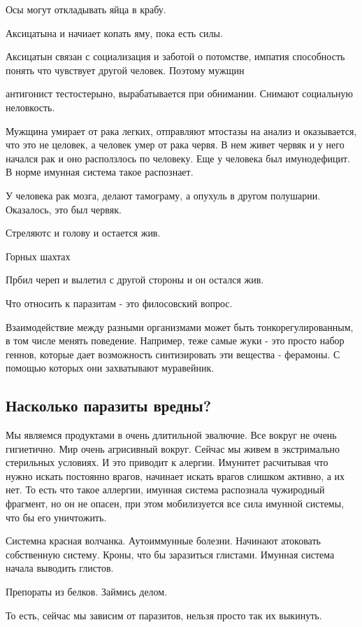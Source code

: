 Осы могут откладывать яйца в крабу. 

Аксицатына и начиает копать яму, пока есть силы.

Аксицатын связан с социализация и 
заботой о потомстве,
импатия способность понять что чувствует
другой человек.
Поэтому мужщин

антигонист тестостерыно,
вырабатывается при обнимании.
Снимают социальную неловкость.


Мужщина умирает от рака легких,
отправляют мтостазы на анализ и
оказывается, что это не целовек,
а человек умер от рака червя. В нем
живет червяк и у него начался рак и оно
расползлось по человеку. Еще
у человека был имунодефицит.
В норме имунная система такое распознает.

У человека рак мозга,
делают тамограму, а опухуль в
другом полушарии. Оказалось,
это был червяк.

Стреляютс и голову и остается жив. 

Горных шахтах

Прбил череп и вылетил с другой стороны и
он остался жив.

Что относить к паразитам - это
филосовский вопрос.

Взаимодействие между разными организмами
может быть тонкорегулированным,
в том числе менять поведение. Например,
теже самые жуки - это
просто набор геннов, которые дает возможность
синтизировать эти вещества - ферамоны. С помощью
которых они захватывают муравейник.


\subsection{Насколько паразиты вредны?}
Мы являемся продуктами в очень длитильной эвалючие.
Все вокруг не очень гигиетично. Мир очень агрисивный вокруг.
Сейчас мы живем в экстримально стерильных условиях.
И это приводит к алергии. Имунитет расчитывая
что нужно искать постоянно врагов,
начинает искать врагов слишком активно,
а их нет. То есть что такое аллергии,
имунная система распознала чужиродный фрагмент, но он
не опасен, при этом мобилизуется все сила имунной системы, что
бы его уничтожить.

Системна красная волчанка. Аутоиммунные болезни. Начинают
атоковать собственную систему. Кроны, что бы
заразиться глистами. Имунная система начала выводить
глистов.

Препораты из белков. Займись делом.

То есть, сейчас мы зависим от паразитов, нельзя
просто так их выкинуть.